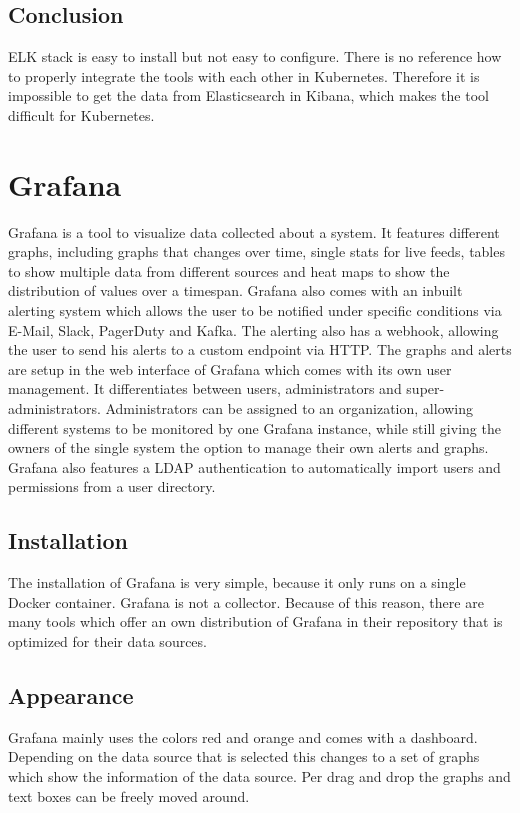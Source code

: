 \subsection{Conclusion}
ELK stack is easy to install but not easy to configure. There is no reference how to properly integrate the tools with each other in Kubernetes. Therefore it is impossible to get the data from Elasticsearch in Kibana, which makes the tool difficult for Kubernetes.
\section{Grafana}
\label{grafana} %
Grafana is a tool to visualize data collected about a system. It features different graphs, including graphs that changes over time, single stats for live feeds, tables to show multiple data from different sources and heat maps to show the distribution of values over a timespan.
Grafana also comes with an inbuilt alerting system which allows the user to be notified under specific conditions via E-Mail, Slack, PagerDuty and Kafka. The alerting also has a webhook, allowing the user to send his alerts to a custom endpoint via HTTP.
The graphs and alerts are setup in the web interface of Grafana which comes with its own user management. It differentiates between users, administrators and super-administrators. Administrators can be assigned to an organization, allowing different systems to be monitored by one Grafana instance, while still giving the owners of the single system the option to manage their own alerts and graphs.
Grafana also features a LDAP authentication to automatically import users and permissions from a user directory.
\subsection{Installation}
The installation of Grafana is very simple, because it only runs on a single Docker container. Grafana is not a collector. Because of this reason, there are many tools which offer an own distribution of Grafana in their repository that is optimized for their data sources.
\subsection{Appearance}%
Grafana mainly uses the colors red and orange and comes with a dashboard. Depending on the data source that is selected this changes to a set of graphs which show the information of the data source. Per drag and drop the graphs and text boxes can be freely moved around. 
